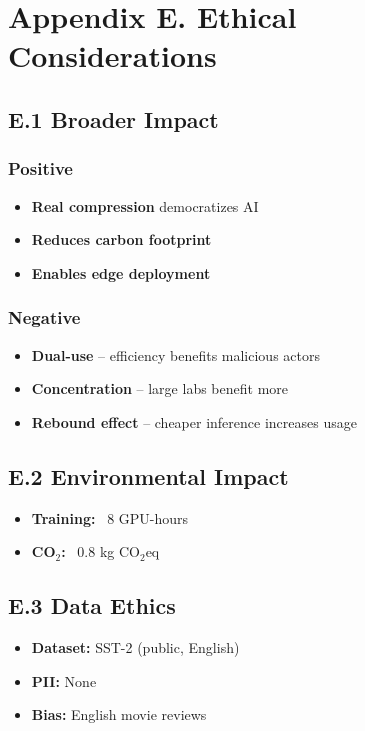 
\section{Appendix E. Ethical Considerations}

\subsection{E.1 Broader Impact}

\subsubsection{Positive}
\begin{itemize}
\item \textbf{Real compression} democratizes AI
\item \textbf{Reduces carbon footprint}
\item \textbf{Enables edge deployment}

\end{itemize}
\subsubsection{Negative}
\begin{itemize}
\item \textbf{Dual-use} -- efficiency benefits malicious actors
\item \textbf{Concentration} -- large labs benefit more
\item \textbf{Rebound effect} -- cheaper inference increases usage

\end{itemize}
\subsection{E.2 Environmental Impact}

\begin{itemize}
\item \textbf{Training:} ~8 GPU-hours
\item \textbf{CO$_2$:} ~0.8 kg CO$_2$eq

\end{itemize}
\subsection{E.3 Data Ethics}

\begin{itemize}
\item \textbf{Dataset:} SST-2 (public, English)
\item \textbf{PII:} None
\item \textbf{Bias:} English movie reviews

\end{itemize}
